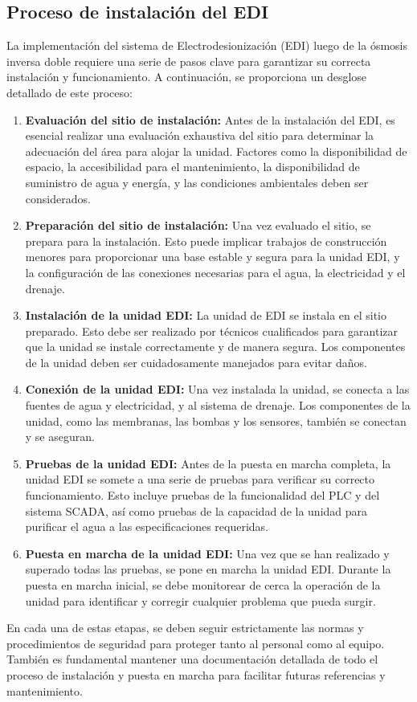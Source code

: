 \subsection{Proceso de instalación del EDI}

La implementación del sistema de Electrodesionización (EDI) luego de la ósmosis inversa doble requiere una serie de pasos clave para garantizar su correcta instalación y funcionamiento. A continuación, se proporciona un desglose detallado de este proceso:

\begin{enumerate}
    \item \textbf{Evaluación del sitio de instalación:} Antes de la instalación del EDI, es esencial realizar una evaluación exhaustiva del sitio para determinar la adecuación del área para alojar la unidad. Factores como la disponibilidad de espacio, la accesibilidad para el mantenimiento, la disponibilidad de suministro de agua y energía, y las condiciones ambientales deben ser considerados.

    \item \textbf{Preparación del sitio de instalación:} Una vez evaluado el sitio, se prepara para la instalación. Esto puede implicar trabajos de construcción menores para proporcionar una base estable y segura para la unidad EDI, y la configuración de las conexiones necesarias para el agua, la electricidad y el drenaje.

    \item \textbf{Instalación de la unidad EDI:} La unidad de EDI se instala en el sitio preparado. Esto debe ser realizado por técnicos cualificados para garantizar que la unidad se instale correctamente y de manera segura. Los componentes de la unidad deben ser cuidadosamente manejados para evitar daños.

    \item \textbf{Conexión de la unidad EDI:} Una vez instalada la unidad, se conecta a las fuentes de agua y electricidad, y al sistema de drenaje. Los componentes de la unidad, como las membranas, las bombas y los sensores, también se conectan y se aseguran.

    \item \textbf{Pruebas de la unidad EDI:} Antes de la puesta en marcha completa, la unidad EDI se somete a una serie de pruebas para verificar su correcto funcionamiento. Esto incluye pruebas de la funcionalidad del PLC y del sistema SCADA, así como pruebas de la capacidad de la unidad para purificar el agua a las especificaciones requeridas.

    \item \textbf{Puesta en marcha de la unidad EDI:} Una vez que se han realizado y superado todas las pruebas, se pone en marcha la unidad EDI. Durante la puesta en marcha inicial, se debe monitorear de cerca la operación de la unidad para identificar y corregir cualquier problema que pueda surgir.
\end{enumerate}

En cada una de estas etapas, se deben seguir estrictamente las normas y procedimientos de seguridad para proteger tanto al personal como al equipo. También es fundamental mantener una documentación detallada de todo el proceso de instalación y puesta en marcha para facilitar futuras referencias y mantenimiento.
